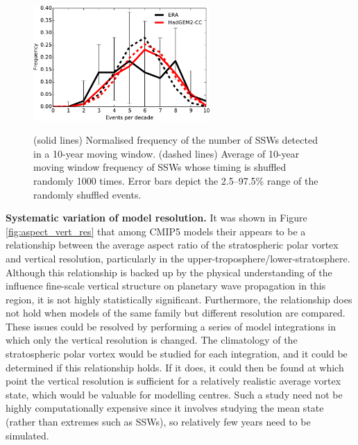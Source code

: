 \begin{figure}[t]
  \centering
  \noindent\includegraphics[width=0.6\textwidth,angle=0]{figures/chapter-conclusions/events_decadal.pdf}\\
  \caption[Decadal variability of SSWs]{(solid lines) Normalised frequency of
    the number of SSWs detected in a 10-year moving window. (dashed lines)
    Average of 10-year moving window frequency of SSWs whose timing is shuffled
    randomly 1000 times. Error bars depict the 2.5--97.5\%
    range of the randomly shuffled events.}\label{fig:decadal}
\end{figure}

\bigskip\noindent\textbf{Systematic variation of model resolution.} It was shown
in Figure \ref{fig:aspect_vert_res} that among CMIP5 models their appears to be
a relationship between the average aspect ratio of the stratospheric polar
vortex and vertical resolution, particularly in the
upper-troposphere/lower-stratosphere. Although this relationship is backed up by
the physical understanding of the influence fine-scale vertical structure on
planetary wave propagation in this region, it is not highly statistically
significant. Furthermore, the relationship does not hold when models of the same
family but different resolution are compared. These issues could be resolved by
performing a series of model integrations in which only the vertical resolution
is changed. The climatology of the stratospheric polar vortex would be studied
for each integration, and it could be determined if this relationship holds. If
it does, it could then be found at which point the vertical resolution is
sufficient for a relatively realistic average vortex state, which would be
valuable for modelling centres. Such a study need not be highly computationally
expensive since it involves studying the mean state (rather than extremes such
as SSWs), so relatively few years need to be simulated. 

